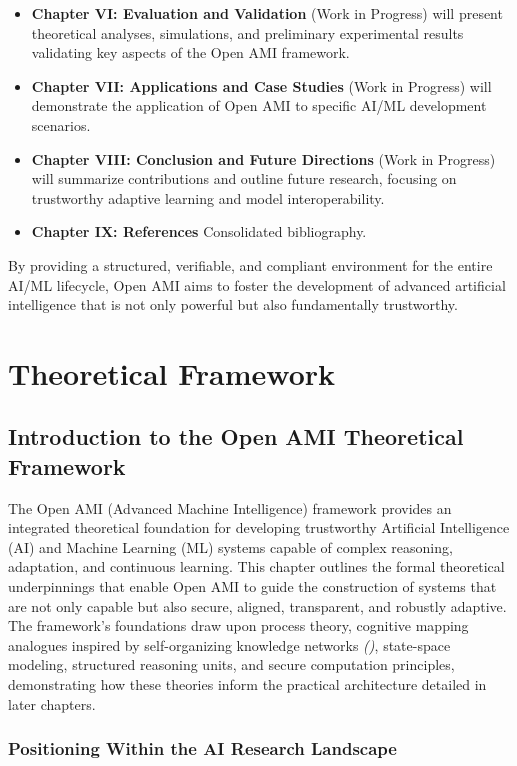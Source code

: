 \documentclass[12pt,a4paper]{report}
\renewcommand{\citep}[1]{\textit{\scriptsize{(\cite{#1})}}}
\begin{document}
\begin{itemize}[leftmargin=*]
		\item \textbf{Chapter VI: Evaluation and Validation} (Work in Progress) will present theoretical analyses, simulations, and preliminary experimental results validating key aspects of the Open AMI framework.
		\item \textbf{Chapter VII: Applications and Case Studies} (Work in Progress) will demonstrate the application of Open AMI to specific AI/ML development scenarios.
		\item \textbf{Chapter VIII: Conclusion and Future Directions} (Work in Progress) will summarize contributions and outline future research, focusing on trustworthy adaptive learning and model interoperability.
		\item \textbf{Chapter IX: References} Consolidated bibliography.
	\end{itemize}
	
	By providing a structured, verifiable, and compliant environment for the entire AI/ML lifecycle, Open AMI aims to foster the development of advanced artificial intelligence that is not only powerful but also fundamentally trustworthy.
	
		\chapter{Theoretical Framework}
	\label{ch:theoretical_framework}
	
	\section{Introduction to the Open AMI Theoretical Framework}
	\label{sec:2-1}
	
	The Open AMI (Advanced Machine Intelligence) framework provides an integrated theoretical foundation for developing trustworthy Artificial Intelligence (AI) and Machine Learning (ML) systems capable of complex reasoning, adaptation, and continuous learning. This chapter outlines the formal theoretical underpinnings that enable Open AMI to guide the construction of systems that are not only capable but also secure, aligned, transparent, and robustly adaptive. The framework's foundations draw upon process theory, cognitive mapping analogues inspired by self-organizing knowledge networks \citep{Buehler2025AgenticGraphRef}, state-space modeling, structured reasoning units, and secure computation principles, demonstrating how these theories inform the practical architecture detailed in later chapters.
	
	\subsection{Positioning Within the AI Research Landscape}
	\label{sec:2-1-1}
	
\end{document}
